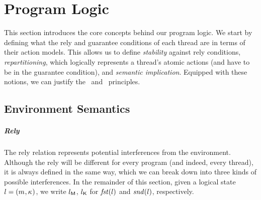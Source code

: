 \chapter{\colosl Program Logic}\label{chapter:semantics}
This section introduces the core concepts behind our program logic. We start by defining what the rely and guarantee conditions of each thread are in terms of their action models. This allows us to define \emph{stability} against rely conditions, \emph{repartitioning}, which logically represents a thread's atomic actions (and have to be in the guarantee condition), and \emph{semantic implication}. Equipped with these notions, we can justify the \shiftRule\ and \extendRule\ principles. 
%
%
\section{Environment Semantics}
\paragraph{Rely}
The rely relation represents potential interferences from the environment. Although the rely will be different for every program (and indeed, every thread), it is always defined in the same way, which we can break down into three kinds of possible interferences. In the remainder of this section, given a logical state $l = (m_{},\kappa_{})$, we write $l_{\textsf{M}}$, $l_{\textsf{K}}$ for $\mathit{fst}(l)$ and $\mathit{snd}(l)$, respectively.


